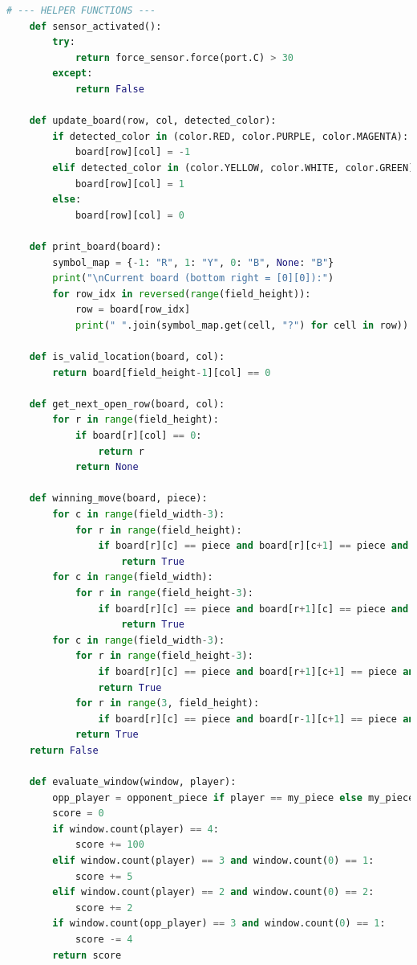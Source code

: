 \begin{lstlisting}[language=Python]
	# --- HELPER FUNCTIONS ---
	def sensor_activated():
		try:   
			return force_sensor.force(port.C) > 30
		except:
			return False
	
	def update_board(row, col, detected_color):
		if detected_color in (color.RED, color.PURPLE, color.MAGENTA):
			board[row][col] = -1
		elif detected_color in (color.YELLOW, color.WHITE, color.GREEN):
			board[row][col] = 1
		else:
			board[row][col] = 0
	
	def print_board(board):
		symbol_map = {-1: "R", 1: "Y", 0: "B", None: "B"} 
		print("\nCurrent board (bottom right = [0][0]):")
		for row_idx in reversed(range(field_height)):
			row = board[row_idx]
			print(" ".join(symbol_map.get(cell, "?") for cell in row))
	
	def is_valid_location(board, col):
		return board[field_height-1][col] == 0
	
	def get_next_open_row(board, col):
		for r in range(field_height):
			if board[r][col] == 0:
				return r
			return None
	
	def winning_move(board, piece):
		for c in range(field_width-3):
			for r in range(field_height):
				if board[r][c] == piece and board[r][c+1] == piece and board[r][c+2] == piece and board[r][c+3] == piece:
					return True
		for c in range(field_width):
			for r in range(field_height-3):
				if board[r][c] == piece and board[r+1][c] == piece and board[r+2][c] == piece and board[r+3][c] == piece:
					return True
		for c in range(field_width-3):
			for r in range(field_height-3):
				if board[r][c] == piece and board[r+1][c+1] == piece and board[r+2][c+2] == piece and board[r+3][c+3] == piece:
				return True
			for r in range(3, field_height):
				if board[r][c] == piece and board[r-1][c+1] == piece and board[r-2][c+2] == piece and board[r-3][c+3] == piece:
			return True
	return False
	
	def evaluate_window(window, player):
		opp_player = opponent_piece if player == my_piece else my_piece
		score = 0
		if window.count(player) == 4:
			score += 100
		elif window.count(player) == 3 and window.count(0) == 1:
			score += 5
		elif window.count(player) == 2 and window.count(0) == 2:
			score += 2
		if window.count(opp_player) == 3 and window.count(0) == 1:
			score -= 4
		return score
	

\end{lstlisting}
